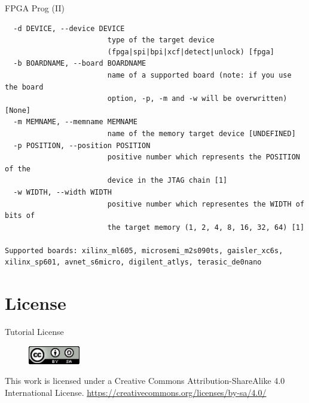 \documentclass{beamer}
\begin{document}
\begin{frame}[fragile]{FPGA Prog (II)}
  \scriptsize
  \begin{verbatim}
  -d DEVICE, --device DEVICE
                        type of the target device
                        (fpga|spi|bpi|xcf|detect|unlock) [fpga]
  -b BOARDNAME, --board BOARDNAME
                        name of a supported board (note: if you use the board
                        option, -p, -m and -w will be overwritten) [None]
  -m MEMNAME, --memname MEMNAME
                        name of the memory target device [UNDEFINED]
  -p POSITION, --position POSITION
                        positive number which represents the POSITION of the
                        device in the JTAG chain [1]
  -w WIDTH, --width WIDTH
                        positive number which representes the WIDTH of bits of
                        the target memory (1, 2, 4, 8, 16, 32, 64) [1]

Supported boards: xilinx_ml605, microsemi_m2s090ts, gaisler_xc6s,
xilinx_sp601, avnet_s6micro, digilent_atlys, terasic_de0nano
  \end{verbatim}
\end{frame}


\section{License}

\begin{frame}{Tutorial License}
  \begin{figure}[!t]
    \includegraphics[width=0.2\textwidth]{../images/cc-by-sa.png}
  \end{figure}
  \centering
  This work is licensed under a Creative Commons Attribution-ShareAlike 4.0 International License.
  \url{https://creativecommons.org/licenses/by-sa/4.0/}
\end{frame}
\end{document}
